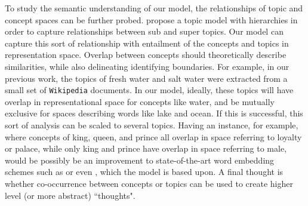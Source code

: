 \documentclass{article}
\begin{document}
To study the semantic understanding of our model, the relationships of topic and concept spaces can be further probed. \cite{HTM} propose a topic model with hierarchies in order to capture relationships between sub and super topics. Our model can capture this sort of relationship with entailment of the concepts and topics in representation space. Overlap between concepts should theoretically describe similarities, while also delineating identifying boundaries. For example, in our previous work, the topics of fresh water and salt water were extracted from a small set of \texttt{Wikipedia} documents. In our model, ideally, these topics will have overlap in representational space for concepts like water, and be mutually exclusive for spaces describing words like lake and ocean. If this is successful, this sort of analysis can be scaled to several topics. Having an instance, for example, where concepts of king, queen, and prince all overlap in space referring to loyalty or palace, while only king and prince have overlap in space referring to male, would be possibly be an improvement to state-of-the-art word embedding schemes such as \cite{Mikolov} or even \cite{Pennington}, which the model is based upon. A final thought is whether co-occurrence between concepts or topics can be used to create higher level (or more abstract) ``thoughts".

\printbibliography
\end{document}
